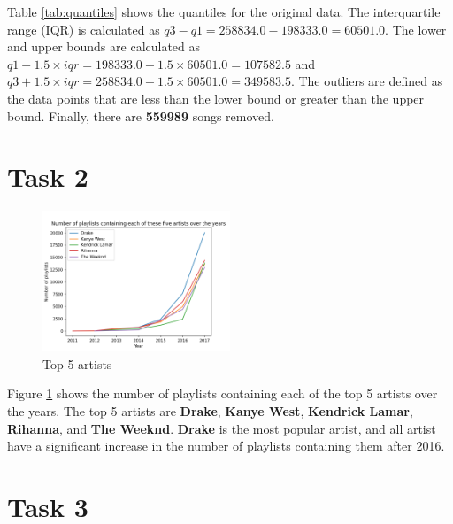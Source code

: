 \documentclass[11pt,letterpaper]{article}
\begin{document}
Table \ref{tab:quantiles} shows the quantiles for the original data. The interquartile range (IQR) is calculated as $q3 - q1 = 258834.0 - 198333.0 = 60501.0$. The lower and upper bounds are calculated as $q1 - 1.5 \times iqr = 198333.0 - 1.5 \times 60501.0 = 107582.5$ and $q3 + 1.5 \times iqr = 258834.0 + 1.5 \times 60501.0 = 349583.5$. The outliers are defined as the data points that are less than the lower bound or greater than the upper bound. Finally, there are \textbf{559989} songs removed.
\newpage
\section*{Task 2}

\begin{figure}[!htbp]
    \centering
    \includegraphics[width=0.5\textwidth]{data/top_5_artist.png}
    \caption{Top 5 artists}
    \label{fig:top_5_artist}
\end{figure}

Figure \ref{fig:top_5_artist} shows the number of playlists containing each of the top 5 artists over the years. The top 5 artists are \textbf{Drake}, \textbf{Kanye West}, \textbf{Kendrick Lamar}, \textbf{Rihanna}, and \textbf{The Weeknd}. \textbf{Drake} is the most popular artist, and all artist have a significant increase in the number of playlists containing them after 2016.

\section*{Task 3}

\end{document}
